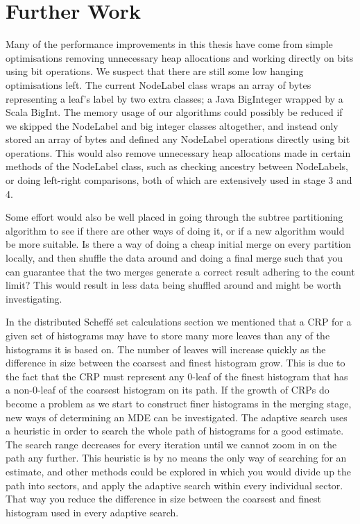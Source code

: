 \documentclass{report}
\begin{document}
\section{Further Work}

Many of the performance improvements in this thesis have come from simple optimisations removing unnecessary heap allocations and working directly on bits using bit operations. We suspect that there are still some low hanging 
 optimisations left. The current NodeLabel class wraps an array of bytes representing a leaf's label by two extra classes; a Java BigInteger wrapped by a Scala BigInt. The memory usage of our algorithms could possibly be
reduced if we skipped the NodeLabel and big integer classes altogether, and instead only stored an array of bytes and defined any NodeLabel operations directly using bit operations. This would also remove unnecessary heap allocations made in certain 
methods of the NodeLabel class, such as checking ancestry between NodeLabels, or doing left-right comparisons, both of which are extensively used in stage 3 and 4. 

Some effort would also be well placed in going through the subtree partitioning algorithm to see if there are other ways of doing it, or if a new algorithm would be more suitable. Is there a way of 
doing a cheap initial merge on every partition locally, and then shuffle the data around and doing a final merge such that you can guarantee that the two merges generate a correct result adhering to the count limit?
This would result in less data being shuffled around and might be worth investigating.

In the distributed Scheffé set calculations section we mentioned that a CRP for a given set of histograms may have to store many more leaves than any of the histograms it is based on. The number of leaves will increase quickly
as the difference in size between the coarsest and finest histogram grow. This is due to the fact that the CRP must represent any 0-leaf of the finest histogram that has a non-0-leaf of the coarsest histogram on its path.
If the growth of CRPs do become a problem as we start to construct finer histograms in the merging stage, 
new ways of determining an MDE can be investigated. 
The adaptive search uses a heuristic in order to search the whole path of histograms for a good estimate.
The search range decreases for every iteration until we cannot zoom in on the path any further.
This heuristic is by no means the only way of searching for an estimate, and 
other methods could be explored 
in which you would divide up the path into sectors, and apply the adaptive search within every individual sector. That way you reduce the difference in size between the coarsest and finest histogram used in every adaptive search.
\end{document}
